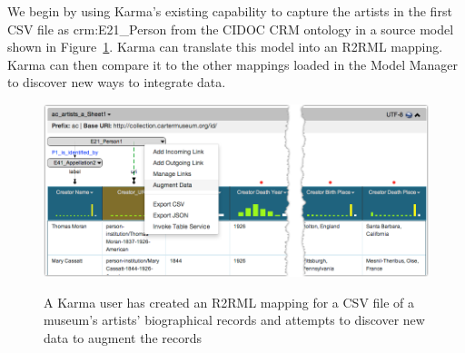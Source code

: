 We begin by using Karma's existing capability to capture the artists in the first CSV file as crm:E21\_Person from the CIDOC CRM ontology in a source model shown in Figure~\ref{fig:simple-model-screenshot}.  
Karma can translate this model into an R2RML mapping.
Karma can then compare it to the other mappings loaded in the Model Manager to discover new ways to integrate data.


\begin{figure}
\begin{center}
\includegraphics[width=4.8in]{images/4-simple-model.png}
\vspace{-3mm}
\caption{A Karma user has created an R2RML mapping for a CSV file of a museum's artists' biographical records and attempts to discover new data to augment the records}
\vspace{-2mm}
\label{fig:simple-model-screenshot}
\end{center}
\vspace{-1.5em}
\end{figure}
